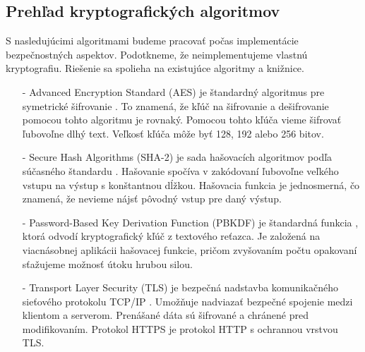 \subsection{Prehľad kryptografických algoritmov}
S nasledujúcimi algoritmami budeme pracovať počas implementácie bezpečnostných aspektov. Podotkneme, že neimplementujeme vlastnú kryptografiu. Riešenie sa spolieha na existujúce algoritmy a knižnice. 
\begin{itemize}
    \item[-] Advanced Encryption Standard (AES) je štandardný algoritmus pre symetrické šifrovanie \cite{aes}. To znamená, že kľúč na šifrovanie a dešifrovanie pomocou tohto algoritmu je rovnaký. Pomocou tohto kľúča vieme šifrovať ľubovoľne dlhý text. Veľkosť kľúča môže byť 128, 192 alebo 256 bitov.
    \item[-] Secure Hash Algorithms (SHA-2) je sada hašovacích algoritmov podľa súčasného štandardu \cite{sha}. Hašovanie spočíva v zakódovaní ľubovoľne veľkého vstupu na výstup s konštantnou dĺžkou. Hašovacia funkcia je jednosmerná, čo znamená, že nevieme nájsť pôvodný vstup pre daný výstup.  
    \item[-] Password-Based Key Derivation Function (PBKDF) je štandardná funkcia \cite{pbkdf}, ktorá odvodí kryptografický kľúč z textového reťazca. Je založená na viacnásobnej aplikácii hašovacej funkcie, pričom zvyšovaním počtu opakovaní sťažujeme možnosť útoku hrubou silou.
    \item[-] Transport Layer Security (TLS) je bezpečná nadstavba komunikačného sieťového protokolu TCP/IP \cite{tls}. Umožňuje nadviazať bezpečné spojenie medzi klientom a serverom. Prenášané dáta sú šifrované a chránené pred modifikovaním. Protokol HTTPS je protokol HTTP s ochrannou vrstvou TLS. 
\end{itemize}

